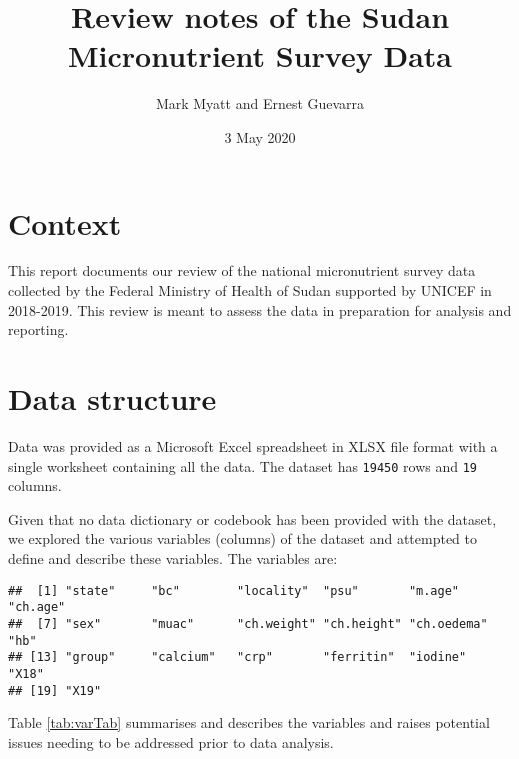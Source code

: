 \documentclass[12pt,a4paper]{article}
\title{\vspace{8cm} \LARGE{Review notes of the Sudan Micronutrient Survey Data}}
\author{Mark Myatt and Ernest Guevarra}
\date{3 May 2020}
\begin{document}
\maketitle

\newpage

\newpage

\hypertarget{context}{%
\section{Context}\label{context}}

This report documents our review of the national micronutrient survey data collected by the Federal Ministry of Health of Sudan supported by UNICEF in 2018-2019. This review is meant to assess the data in preparation for analysis and reporting.

\hypertarget{data-structure}{%
\section{Data structure}\label{data-structure}}

Data was provided as a Microsoft Excel spreadsheet in XLSX file format with a single worksheet containing all the data. The dataset has \texttt{19450} rows and \texttt{19} columns.

Given that no data dictionary or codebook has been provided with the dataset, we explored the various variables (columns) of the dataset and attempted to define and describe these variables. The variables are:

\begin{verbatim}
##  [1] "state"     "bc"        "locality"  "psu"       "m.age"     "ch.age"   
##  [7] "sex"       "muac"      "ch.weight" "ch.height" "ch.oedema" "hb"       
## [13] "group"     "calcium"   "crp"       "ferritin"  "iodine"    "X18"      
## [19] "X19"
\end{verbatim}

Table \ref{tab:varTab} summarises and describes the variables and raises potential issues needing to be addressed prior to data analysis.
\end{document}
